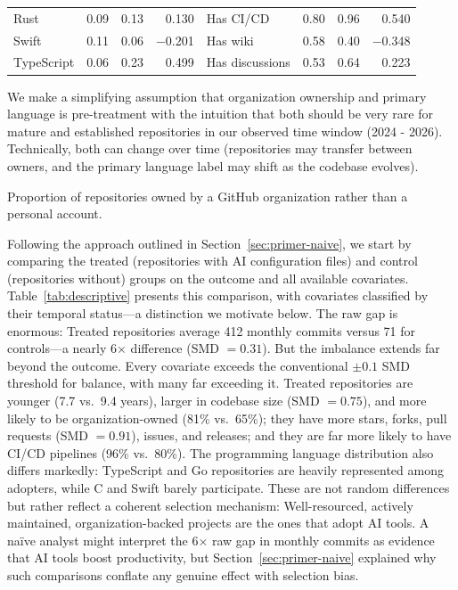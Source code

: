 \begin{table}[t]
\begin{threeparttable}
\begin{tabular}{lrrrlrrr}
  Rust & 0.09 & 0.13 & 0.130 & Has CI/CD & 0.80 & 0.96 & 0.540 \\
  Swift & 0.11 & 0.06 & $-$0.201 & Has wiki & 0.58 & 0.40 & $-$0.348 \\
  TypeScript & 0.06 & 0.23 & 0.499 & Has discussions & 0.53 & 0.64 & 0.223 \\
  \bottomrule
  \end{tabular}
  \begin{tablenotes}\footnotesize
  \item[a] We make a simplifying assumption that organization ownership and primary language is pre-treatment with the intuition that both should be very rare for mature and established repositories in our observed time window (2024 - 2026). Technically, both can change over time (repositories may transfer between owners, and the primary language label may shift as the codebase evolves).
  \item[b] Proportion of repositories owned by a GitHub organization rather than a personal account.
  \end{tablenotes}
  \end{threeparttable}
\end{table}

Following the approach outlined in Section~\ref{sec:primer-naive}, we start by comparing the treated (repositories with AI configuration files) and control (repositories without) groups on the outcome and all available covariates.
Table~\ref{tab:descriptive} presents this comparison, with covariates classified by their temporal status---a distinction we motivate below.
The raw gap is enormous: Treated repositories average 412 monthly commits versus 71 for controls---a nearly 6$\times$ difference (SMD $= 0.31$).
But the imbalance extends far beyond the outcome.
Every covariate exceeds the conventional $\pm 0.1$ SMD threshold for balance, with many far exceeding it.
Treated repositories are younger (7.7 vs.\ 9.4 years), larger in codebase size (SMD $= 0.75$), and more likely to be organization-owned (81\% vs.\ 65\%); they have more stars, forks, pull requests (SMD $= 0.91$), issues, and releases; and they are far more likely to have CI/CD pipelines (96\% vs.\ 80\%).
The programming language distribution also differs markedly: TypeScript and Go repositories are heavily represented among adopters, while C and Swift barely participate.
These are not random differences but rather reflect a coherent selection mechanism: Well-resourced, actively maintained, organization-backed projects are the ones that adopt AI tools.
A na\"ive analyst might interpret the 6$\times$ raw gap in monthly commits as evidence that AI tools boost productivity, but Section~\ref{sec:primer-naive} explained why such comparisons conflate any genuine effect with selection bias.

